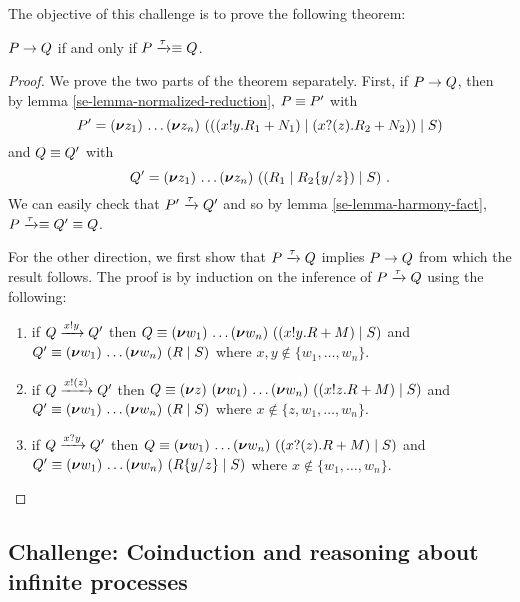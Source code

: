 The objective of this challenge is to prove the following theorem:
\begin{theorem}
  \( P \rightarrow Q \) if and only if \( P \xrightarrow{\tau} \equiv Q \).
\end{theorem}
\begin{proof}
  We prove the two parts of the theorem separately. First, if \( P \rightarrow Q \), then by lemma \autoref{se-lemma-normalized-reduction}, \( P \equiv P' \) with
  \begin{equation*}
    P' = (\bm{\nu} z_1)~\!\dots (\bm{\nu} z_n)~(((x ! y . R_1 + N_1) \mid (x ? (z) . R_2 + N_2)) \mid S)
  \end{equation*}
  and \( Q \equiv Q' \) with
  \begin{equation*}
    Q' = (\bm{\nu} z_1)~\!\dots (\bm{\nu} z_n)~((R_1 \mid R_2\{y/z\}) \mid S) \ .
  \end{equation*}
  We can easily check that \( P' \xrightarrow{\tau} Q' \) and so by lemma \autoref{se-lemma-harmony-fact}, \( P \xrightarrow{\tau} \equiv Q' \equiv Q \).

  For the other direction, we first show that \( P \xrightarrow{\tau} Q \) implies \( P \rightarrow Q \) from which the result follows.
  The proof is by induction on the inference of \( P \xrightarrow{\tau} Q \) using the following:
  \begin{enumerate}
  \item if \( Q \xrightarrow{x ! y} Q' \) then \( Q \equiv (\bm{\nu} w_1)~\!\dots (\bm{\nu} w_n)~((x ! y . R + M) \mid S) \) and \( Q' \equiv (\bm{\nu} w_1)~\!\dots (\bm{\nu} w_n)~(R \mid S) \) where \( x,y \notin \{ w_1, \dots, w_n \} \).
  \item if \( Q \xrightarrow{x ! (z)} Q' \) then \( Q \equiv (\bm{\nu} z)~(\bm{\nu} w_1)~\!\dots (\bm{\nu} w_n)~((x ! z . R + M) \mid S) \) and \( Q' \equiv (\bm{\nu} w_1)~\!\dots (\bm{\nu} w_n)~(R \mid S) \) where \( x \notin \{ z, w_1, \dots, w_n \} \).
  \item if \( Q \xrightarrow{x ? y} Q' \) then \( Q \equiv (\bm{\nu} w_1)~\!\dots (\bm{\nu} w_n)~((x ? (z) . R + M) \mid S) \) and \( Q' \equiv (\bm{\nu} w_1)~\!\dots (\bm{\nu} w_n)~(R\{y/z\} \mid S) \) where \( x \notin \{ w_1, \dots, w_n \} \).
  \end{enumerate}
\end{proof}

\subsection{Challenge: Coinduction and reasoning about infinite processes}
\label{sec:challenge:coinduction}

